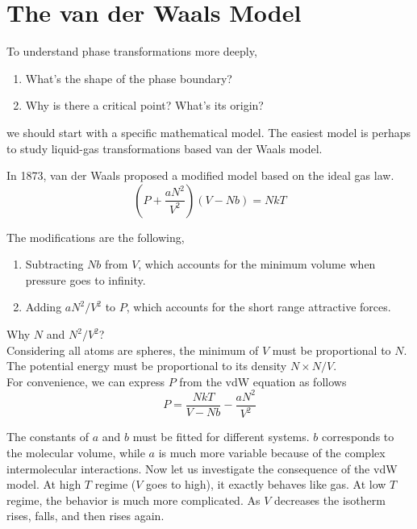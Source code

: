 
\section{The van der Waals Model}
To understand phase transformations more deeply, 
\begin{enumerate}
\item What's the shape of the phase boundary?
\item Why is there a critical point? What's its origin?
\end{enumerate}

we should start with a specific mathematical model.
The easiest model is perhaps to study liquid-gas transformations based van der Waals model.

In 1873, van der Waals proposed a modified model based on the ideal gas law.
\begin{equation} 
(P + \frac{a N^2}{V^2})(V-Nb) = NkT
\end{equation}

The modifications are the following,
\begin{enumerate}
\item Subtracting $Nb$ from $V$, which accounts for the minimum volume when pressure goes to infinity. 
\item Adding $aN^2/V^2$ to $P$, which accounts for the short range attractive forces.
\end{enumerate}

Why $N$ and $N^2/V^2$?\\
Considering all atoms are spheres, the minimum of $V$ must be proportional to $N$.\\
The potential energy must be proportional to its density $N \times N/V$.\\

For convenience, we can express $P$ from the vdW equation as follows
\begin{equation} 
P = \frac{NkT}{V-Nb}-\frac{aN^2}{V^2}
\end{equation}

The constants of $a$ and $b$ must be fitted for different systems.
$b$ corresponds to the molecular volume, while $a$ is much more variable because of the complex intermolecular interactions.
Now let us investigate the consequence of the vdW model.
At high $T$ regime ($V$ goes to high), it exactly behaves like gas.
At low $T$ regime, the behavior is much more complicated. As $V$ decreases the isotherm rises, falls, and then rises again.


